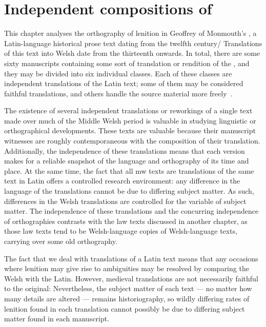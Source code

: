 \chapter{Independent compositions of }
This chapter analyses the orthography of lenition in Geoffrey of Monmouth's , a Latin-language historical prose text dating from the twelfth century/
Translations of this text into Welsh date from the thirteenth onwards.
In total, there are some sixty manuscripts containing some sort of translation or rendition of the , and they may be divided into six individual classes.
Each of these classes are independent translations of the Latin text; some of them may be considered faithful translations, and others handle the source material more freely~\autocite[xxiv-xxxi]{roberts_brut_1971}.

The existence of several independent translations or reworkings of a single text made over much of the Middle Welsh period is valuable in studying linguistic or orthographical developments.
These texts are valuable because their manuscript witnesses are roughly contemporaneous with the composition of their translation.
Additionally, the independence of these translations means that each version makes for a reliable snapshot of the language and orthography of its time and place.
At the same time, the fact that all \gls{mw} texts are translations of the same text in Latin offers a controlled research environment:  any difference in the language of the translations cannot be due to differing subject matter.
As such, differences in the Welsh translations are controlled for the variable of subject matter.
The independence of these translations and the concurring independence of orthographies contrasts with the law texts discussed in another chapter, as those law texts tend to be Welsh-language copies of Welsh-language texts, carrying over some old orthography.

The fact that we deal with translations of a Latin text means that any occasions where lenition may give rise to ambiguities may be resolved by comparing the Welsh with the Latin.
However, medieval translations are not necessarily faithful to the original:
Nevertheless, the subject matter of each text --- no matter how many details are altered --- remains historiography, so wildly differing rates of lenition found in each translation cannot possibly be due to differing subject matter found in each manuscript.

